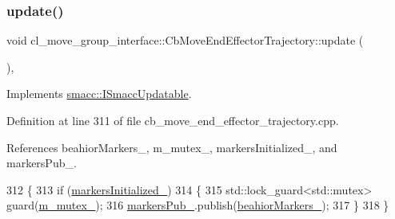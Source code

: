 \mbox{\label{classcl__move__group__interface_1_1CbMoveEndEffectorTrajectory_a57fedb6a0603fe569842a13faf19f5cd}} 
\subsubsection{\texorpdfstring{update()}{update()}}
{\footnotesize\ttfamily void cl\+\_\+move\+\_\+group\+\_\+interface\+::\+Cb\+Move\+End\+Effector\+Trajectory\+::update (\begin{DoxyParamCaption}{ }\end{DoxyParamCaption})\hspace{0.3cm}{\ttfamily [override]}, {\ttfamily [virtual]}}



Implements \hyperlink{classsmacc_1_1ISmaccUpdatable_a84ee0520cbefdb1d412bed54650b028e}{smacc\+::\+I\+Smacc\+Updatable}.



Definition at line 311 of file cb\+\_\+move\+\_\+end\+\_\+effector\+\_\+trajectory.\+cpp.



References beahior\+Markers\+\_\+, m\+\_\+mutex\+\_\+, markers\+Initialized\+\_\+, and markers\+Pub\+\_\+.


\begin{DoxyCode}
312     \{
313         \textcolor{keywordflow}{if} (\hyperlink{classcl__move__group__interface_1_1CbMoveEndEffectorTrajectory_ac140a7f0adfb20f1e2900a5c8cd2ca5b}{markersInitialized\_})
314         \{
315             std::lock\_guard<std::mutex> guard(\hyperlink{classcl__move__group__interface_1_1CbMoveEndEffectorTrajectory_a2a98ef725cb3fc7f61654d3d6a2066bb}{m\_mutex\_});
316             \hyperlink{classcl__move__group__interface_1_1CbMoveEndEffectorTrajectory_aabc2216b2d8625fecd83c5ec69928e63}{markersPub\_}.publish(\hyperlink{classcl__move__group__interface_1_1CbMoveEndEffectorTrajectory_a809fb5385adf27c0a1c8f8136566949c}{beahiorMarkers\_});
317         \}
318     \}
\end{DoxyCode}


